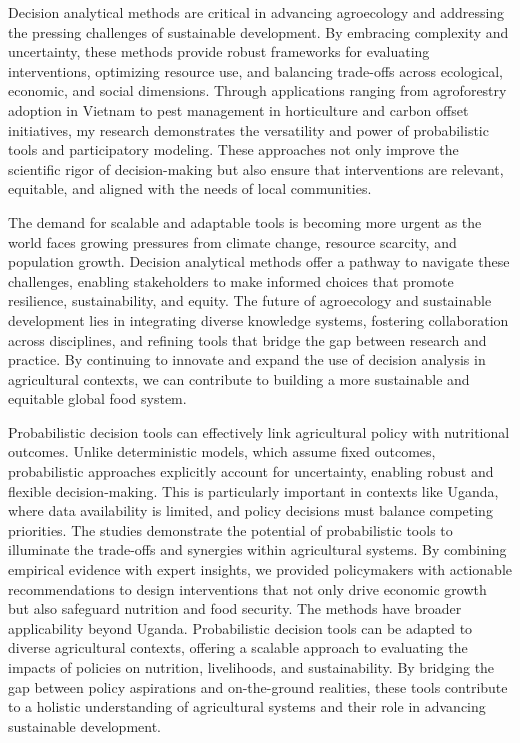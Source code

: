 \documentclass[
]{article}
\begin{document}
Decision analytical methods are critical in advancing agroecology and
addressing the pressing challenges of sustainable development. By
embracing complexity and uncertainty, these methods provide robust
frameworks for evaluating interventions, optimizing resource use, and
balancing trade-offs across ecological, economic, and social dimensions.
Through applications ranging from agroforestry adoption in Vietnam to
pest management in horticulture and carbon offset initiatives, my
research demonstrates the versatility and power of probabilistic tools
and participatory modeling. These approaches not only improve the
scientific rigor of decision-making but also ensure that interventions
are relevant, equitable, and aligned with the needs of local
communities.

The demand for scalable and adaptable tools is becoming more urgent as
the world faces growing pressures from climate change, resource
scarcity, and population growth. Decision analytical methods offer a
pathway to navigate these challenges, enabling stakeholders to make
informed choices that promote resilience, sustainability, and equity.
The future of agroecology and sustainable development lies in
integrating diverse knowledge systems, fostering collaboration across
disciplines, and refining tools that bridge the gap between research and
practice. By continuing to innovate and expand the use of decision
analysis in agricultural contexts, we can contribute to building a more
sustainable and equitable global food system.

Probabilistic decision tools can effectively link agricultural policy
with nutritional outcomes. Unlike deterministic models, which assume
fixed outcomes, probabilistic approaches explicitly account for
uncertainty, enabling robust and flexible decision-making. This is
particularly important in contexts like Uganda, where data availability
is limited, and policy decisions must balance competing priorities. The
studies demonstrate the potential of probabilistic tools to illuminate
the trade-offs and synergies within agricultural systems. By combining
empirical evidence with expert insights, we provided policymakers with
actionable recommendations to design interventions that not only drive
economic growth but also safeguard nutrition and food security. The
methods have broader applicability beyond Uganda. Probabilistic decision
tools can be adapted to diverse agricultural contexts, offering a
scalable approach to evaluating the impacts of policies on nutrition,
livelihoods, and sustainability. By bridging the gap between policy
aspirations and on-the-ground realities, these tools contribute to a
holistic understanding of agricultural systems and their role in
advancing sustainable development.
\end{document}
